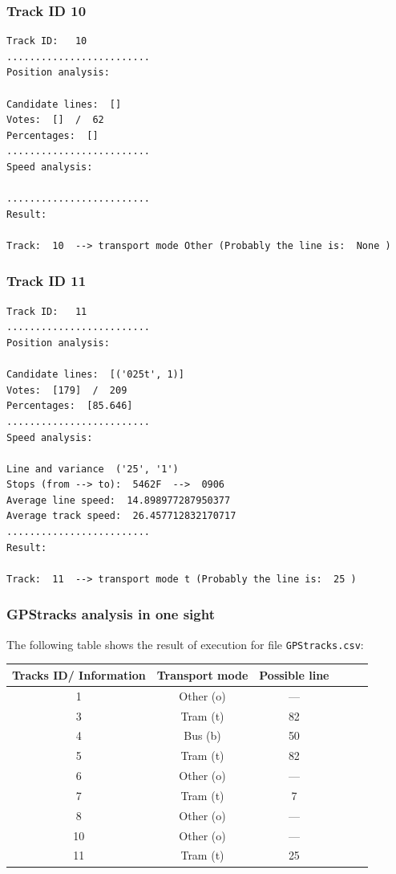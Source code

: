 \documentclass{article}
\begin{document}
\subsubsection{Track ID 10}
\begin{verbatim}
Track ID:   10
.........................
Position analysis: 

Candidate lines:  [] 
Votes:  []  /  62
Percentages:  []
.........................
Speed analysis: 

.........................
Result: 

Track:  10  --> transport mode Other (Probably the line is:  None )
\end{verbatim}
\subsubsection{Track ID 11}
\begin{verbatim}
Track ID:   11
.........................
Position analysis: 

Candidate lines:  [('025t', 1)] 
Votes:  [179]  /  209
Percentages:  [85.646]
.........................
Speed analysis: 

Line and variance  ('25', '1') 
Stops (from --> to):  5462F  -->  0906
Average line speed:  14.898977287950377
Average track speed:  26.457712832170717
.........................
Result: 

Track:  11  --> transport mode t (Probably the line is:  25 )
\end{verbatim}

\subsubsection{GPStracks analysis in one sight}

The following table shows the result of execution for file \texttt{GPStracks.csv}:
\begin{center}
    \begin{tabular}{ | c | c | c | c | c | c | }
        \hline
        Tracks ID/ Information & Transport mode & Possible line  \\ \hline
        1  & Other (o) & ---  \\ \hline
        3  & Tram (t) & 82  \\ \hline
        4  & Bus (b) & 50  \\ \hline
        5  & Tram (t) & 82  \\ \hline
        6  & Other (o) & ---  \\ \hline
        7  & Tram (t) & 7  \\ \hline
        8  & Other (o) & ---  \\ \hline
        10 & Other (o) & ---  \\ \hline
        11 & Tram (t) & 25  \\ \hline
    \end{tabular}
\end{center}
\end{document}
